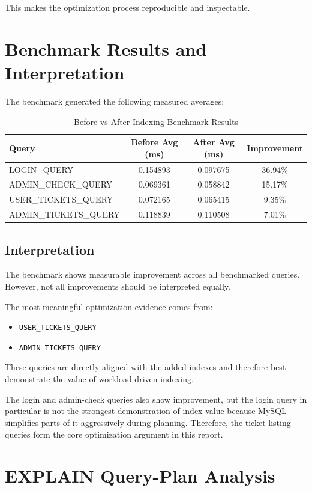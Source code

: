 \documentclass[12pt,a4paper]{article}
\begin{document}
This makes the optimization process reproducible and inspectable.

\section{Benchmark Results and Interpretation}
The benchmark generated the following measured averages:

\begin{table}[H]
\centering
\caption{Before vs After Indexing Benchmark Results}
\begin{tabular}{>{\raggedright\arraybackslash}p{5.1cm}ccc}
\toprule
\textbf{Query} & \textbf{Before Avg (ms)} & \textbf{After Avg (ms)} & \textbf{Improvement} \\
\midrule
LOGIN\_QUERY & 0.154893 & 0.097675 & 36.94\% \\
ADMIN\_CHECK\_QUERY & 0.069361 & 0.058842 & 15.17\% \\
USER\_TICKETS\_QUERY & 0.072165 & 0.065415 & 9.35\% \\
ADMIN\_TICKETS\_QUERY & 0.118839 & 0.110508 & 7.01\% \\
\bottomrule
\end{tabular}
\end{table}

\subsection{Interpretation}
The benchmark shows measurable improvement across all benchmarked queries. However, not all improvements should be interpreted equally.

The most meaningful optimization evidence comes from:
\begin{itemize}[leftmargin=1.5em]
    \item \texttt{USER\_TICKETS\_QUERY}
    \item \texttt{ADMIN\_TICKETS\_QUERY}
\end{itemize}

These queries are directly aligned with the added indexes and therefore best demonstrate the value of workload-driven indexing.

The login and admin-check queries also show improvement, but the login query in particular is not the strongest demonstration of index value because MySQL simplifies parts of it aggressively during planning. Therefore, the ticket listing queries form the core optimization argument in this report.

\section{EXPLAIN Query-Plan Analysis}
\end{document}
